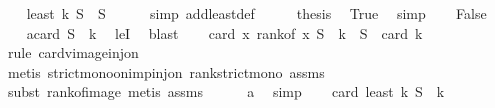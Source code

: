 \begin{isabellebody}
\ \ \isamarkupfalse%
\ {\isachardoublequoteopen}least\ k\ S\ {\isacharequal}{\kern0pt}\ S{\isachardoublequoteclose}\isanewline
\ \ \ \ \isamarkupfalse%
\ {\isacharparenleft}{\kern0pt}simp\ add{\isacharcolon}{\kern0pt}least{\isacharunderscore}{\kern0pt}def{\isacharparenright}{\kern0pt}\isanewline
\ \ \isamarkupfalse%
\ \isamarkupfalse%
\ {\isacharquery}{\kern0pt}thesis\ \isamarkupfalse%
\ True\ \isamarkupfalse%
\ simp\isanewline
{}\isamarkupfalse%
\isanewline
\ \ \isamarkupfalse%
\ False\isanewline
\ \ \isamarkupfalse%
\ a{\isacharcolon}{\kern0pt}{\isachardoublequoteopen}card\ S\ {\isasymge}\ k{\isachardoublequoteclose}\ \isamarkupfalse%
\ leI\ \isamarkupfalse%
\ blast\isanewline
\ \ \isamarkupfalse%
\ {\isachardoublequoteopen}card\ {\isacharparenleft}{\kern0pt}{\isacharparenleft}{\kern0pt}{\isasymlambda}x{\isachardot}{\kern0pt}\ rank{\isacharunderscore}{\kern0pt}of\ x\ S{\isacharparenright}{\kern0pt}\ {\isacharminus}{\kern0pt}{\isacharbackquote}{\kern0pt}\ {\isacharbraceleft}{\kern0pt}{}{\isachardot}{\kern0pt}{\isachardot}{\kern0pt}{\isacharless}{\kern0pt}k{\isacharbraceright}{\kern0pt}\ {\isasyminter}\ S{\isacharparenright}{\kern0pt}\ {\isacharequal}{\kern0pt}\ card\ {\isacharbraceleft}{\kern0pt}{}{\isachardot}{\kern0pt}{\isachardot}{\kern0pt}{\isacharless}{\kern0pt}k{\isacharbraceright}{\kern0pt}{\isachardoublequoteclose}\isanewline
\ \ \ \ \isamarkupfalse%
\ {\isacharparenleft}{\kern0pt}rule\ card{\isacharunderscore}{\kern0pt}vimage{\isacharunderscore}{\kern0pt}inj{\isacharunderscore}{\kern0pt}on{\isacharparenright}{\kern0pt}\isanewline
\ \ \ \ \ \isamarkupfalse%
\ {\isacharparenleft}{\kern0pt}metis\ strict{\isacharunderscore}{\kern0pt}mono{\isacharunderscore}{\kern0pt}on{\isacharunderscore}{\kern0pt}imp{\isacharunderscore}{\kern0pt}inj{\isacharunderscore}{\kern0pt}on\ rank{\isacharunderscore}{\kern0pt}strict{\isacharunderscore}{\kern0pt}mono\ assms{\isacharparenright}{\kern0pt}\ \isanewline
\ \ \ \ \isamarkupfalse%
\ {\isacharparenleft}{\kern0pt}subst\ rank{\isacharunderscore}{\kern0pt}of{\isacharunderscore}{\kern0pt}image{\isacharcomma}{\kern0pt}\ metis\ assms{\isacharparenright}{\kern0pt}\isanewline
\ \ \ \ \isamarkupfalse%
\ a\ \isamarkupfalse%
\ simp\isanewline
\ \ \isamarkupfalse%
\ {\isachardoublequoteopen}card\ {\isacharparenleft}{\kern0pt}least\ k\ S{\isacharparenright}{\kern0pt}\ {\isacharequal}{\kern0pt}\ k{\isachardoublequoteclose}\isanewline

\end{isabellebody}
